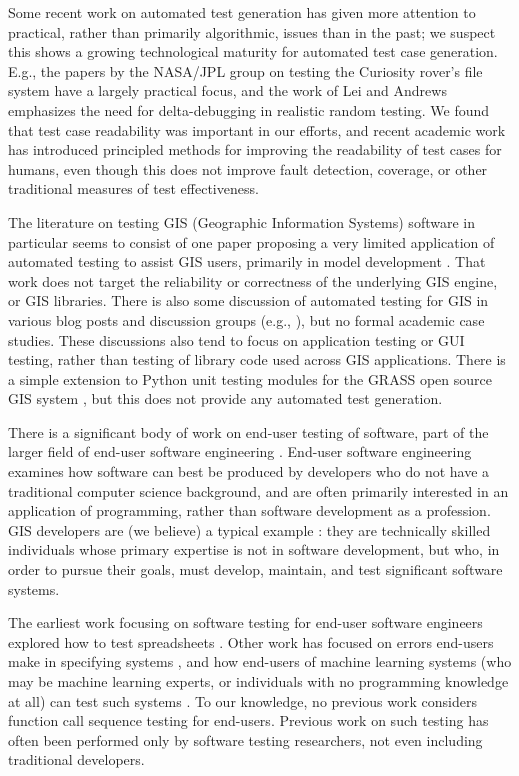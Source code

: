 Some recent work on automated test generation has given more attention
to practical, rather than primarily algorithmic, issues than in the
past; we suspect this shows a growing technological maturity for
automated test case generation.  E.g., the papers by the NASA/JPL
group on testing the Curiosity rover's file system
\cite{ICSEDiff,CFV08,AMAI} have a largely practical focus, and the
work of Lei and Andrews \cite{MinUnit} emphasizes the need for
delta-debugging in realistic random testing.  We found that test case
readability was important in our efforts, and recent academic work
\cite{Readable,Guava} has introduced principled methods for improving
the readability of test cases for humans, even though this does not
improve fault detection, coverage, or other traditional measures of
test effectiveness.

The literature on testing GIS (Geographic Information Systems) software
in particular seems to consist of one paper proposing a very limited
application of automated testing to assist GIS users, primarily in
model development \cite{GISTest}.  That work does not target the
reliability or correctness of the underlying GIS engine, or GIS
libraries.  There is also some discussion of automated testing for GIS
in various blog posts and discussion groups (e.g.,
\cite{gisblog1,gisblog2}), but no formal academic case studies.  These
discussions also tend to focus on application testing or GUI testing,
rather than testing of library code used across GIS applications.
There is a simple extension to Python unit testing modules for the
GRASS open source GIS system \cite{GRASSunit}, but this does not
provide any automated test generation.

There is a significant body of work on end-user testing of software,
part of the larger field of end-user software engineering
\cite{burnettEUSE,Silos}.  End-user software engineering examines how
software can best be produced by developers who do not have a
traditional computer science background, and are often primarily
interested in an application of programming, rather than software
development as a profession.  GIS developers are (we believe) a
typical example \cite{Segal07}:  they are technically skilled  individuals whose
primary expertise is not in software development, but who, in order to
pursue their goals, must develop, maintain, and test significant
software systems.

The earliest work focusing on software testing for
end-user software engineers explored how to test spreadsheets
\cite{rothermelTOSEM,rothermel2000wysiwyt}.  Other work has focused on
errors end-users make in specifying systems \cite{Phalgune}, and how
end-users of machine learning systems (who may be machine learning
experts, or individuals with no programming knowledge at all) can test
such systems \cite{OnlyOracle,kulesza-eud11,shinsel-vlhcc}.  To our
knowledge, no previous work considers function call sequence testing for
end-users.  Previous work on such testing has often been performed
only by software testing researchers, not even including traditional developers.

